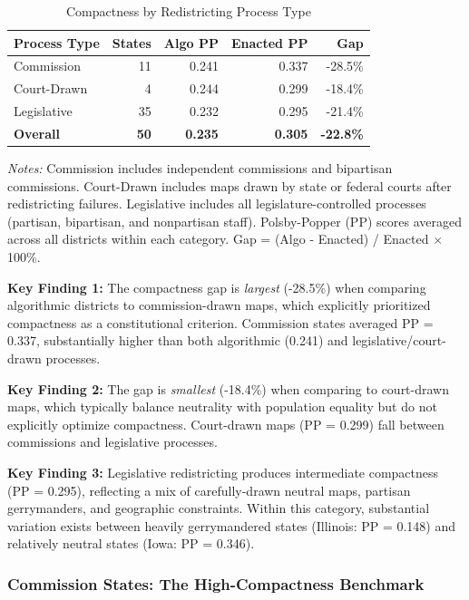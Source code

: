 \begin{table}[h]
\centering
\caption{Compactness by Redistricting Process Type}
\label{tab:process_type_comparison}
\begin{tabular}{lrrrr}
\toprule
\textbf{Process Type} & \textbf{States} & \textbf{Algo PP} & \textbf{Enacted PP} & \textbf{Gap} \\
\midrule
Commission & 11 & 0.241 & 0.337 & -28.5\% \\
Court-Drawn & 4 & 0.244 & 0.299 & -18.4\% \\
Legislative & 35 & 0.232 & 0.295 & -21.4\% \\
\midrule
\textbf{Overall} & \textbf{50} & \textbf{0.235} & \textbf{0.305} & \textbf{-22.8\%} \\
\bottomrule
\end{tabular}
\medskip
\begin{minipage}{\textwidth}
\small
\textit{Notes:} Commission includes independent commissions and bipartisan commissions. Court-Drawn includes maps drawn by state or federal courts after redistricting failures. Legislative includes all legislature-controlled processes (partisan, bipartisan, and nonpartisan staff). Polsby-Popper (PP) scores averaged across all districts within each category. Gap = (Algo - Enacted) / Enacted $\times$ 100\%.
\end{minipage}
\end{table}

\textbf{Key Finding 1:} The compactness gap is \textit{largest} (-28.5\%) when comparing algorithmic districts to commission-drawn maps, which explicitly prioritized compactness as a constitutional criterion. Commission states averaged PP = 0.337, substantially higher than both algorithmic (0.241) and legislative/court-drawn processes.

\textbf{Key Finding 2:} The gap is \textit{smallest} (-18.4\%) when comparing to court-drawn maps, which typically balance neutrality with population equality but do not explicitly optimize compactness. Court-drawn maps (PP = 0.299) fall between commissions and legislative processes.

\textbf{Key Finding 3:} Legislative redistricting produces intermediate compactness (PP = 0.295), reflecting a mix of carefully-drawn neutral maps, partisan gerrymanders, and geographic constraints. Within this category, substantial variation exists between heavily gerrymandered states (Illinois: PP = 0.148) and relatively neutral states (Iowa: PP = 0.346).

\subsubsection{Commission States: The High-Compactness Benchmark}

